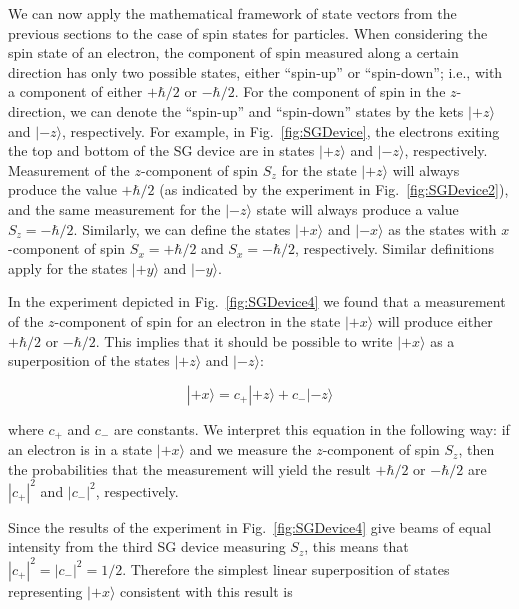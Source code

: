 We can now apply the mathematical framework of state vectors from
the previous sections to the case of spin states for particles.
When considering the spin state of an electron, the component
of spin measured along a certain direction has only two possible
states, either ``spin-up'' or ``spin-down''; i.e., with a component
of either $+\hbar/2$ or $-\hbar/2$. For the component of spin in the
$z$-direction, we can denote the ``spin-up'' and ``spin-down'' states by
the kets $|\mbox{$+z$}\rangle$ and $|\mbox{$-z$}\rangle$, respectively.
For example, in Fig.~\ref{fig:SGDevice}, the electrons exiting the
top and bottom of the SG device are in states $|\mbox{$+z$}\rangle$
and $|\mbox{$-z$}\rangle$, respectively.  Measurement of the
$z$-component of spin $S_z$ for the state $|\mbox{$+z$}\rangle$
will always produce the value $+\hbar/2$ (as indicated by the
experiment in Fig.~\ref{fig:SGDevice2}), and the same measurement
for the $|\mbox{$-z$}\rangle$ state will always produce a value $S_z
= -\hbar/2$.  Similarly, we can define the states $|\mbox{$+x$}\rangle$
and $|\mbox{$-x$}\rangle$ as the states with $x$-component of spin $S_x =
+\hbar/2$ and $S_x = -\hbar/2$, respectively.  Similar definitions apply
for the states $|\mbox{$+y$}\rangle$ and $|\mbox{$-y$}\rangle$.

In the experiment depicted in Fig.~\ref{fig:SGDevice4} we found that
a measurement of the $z$-component of spin for an electron in the state
$|\mbox{$+x$}\rangle$ will produce either $+\hbar/2$ or $-\hbar/2$.
This implies that it should be possible to write $|\mbox{$+x$}\rangle$
as a superposition of the states $|\mbox{$+z$}\rangle$ and
$|\mbox{$-z$}\rangle$:

\begin{equation}
|\mbox{$+x$}\rangle = c_+ |\mbox{$+z$}\rangle + c_- |\mbox{$-z$}\rangle
\label{eq:superState}
\end{equation}

\noindent where $c_+$ and $c_-$ are constants.  We interpret this equation
in the following way: if an electron is in a state $|\mbox{$+x$}\rangle$
and we measure the $z$-component of spin $S_z$, then the probabilities
that the measurement will yield the result $+\hbar/2$ or $-\hbar/2$
are $|c_+|^2$ and $|c_-|^2$, respectively.

Since the results of the experiment in Fig.~\ref{fig:SGDevice4} give
beams of equal intensity from the third SG device measuring $S_z$, this
means that $|c_+|^2 = |c_-|^2 = 1/2$.  Therefore the simplest linear
superposition of states representing $|\mbox{$+x$}\rangle$ consistent
with this result is

